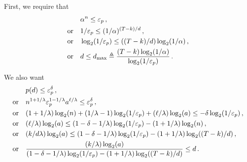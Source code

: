   First, we require that 
  \begin{align*}
    &\alpha^n \leq \mathsf{\varepsilon}_p\,,\\
    \text{or}\quad &
      1/\mathsf{\varepsilon}_p \leq (1/\alpha)^{(T - k)/d}\,,\\
    \text{or}\quad &
      \log_2(1/\mathsf{\varepsilon}_p) \leq ((T - k)/d)\log_2(1/\alpha)\,,\\
    \text{or}\quad &
      d \leq d_\mathrm{max} \triangleq \frac{(T - k)\log_2(1/\alpha)}{\log_2(1/\mathsf{\varepsilon}_p)}
      \,.
  \end{align*}

  We also want 
  \begin{align*}
    &p(d) \leq \mathsf{\varepsilon}_p^{\delta}\,,\\
    \text{or}\quad &
      n^{1+1/\lambda} \mathsf{\varepsilon}_p^{1 - 1/\lambda} a^{\ell/\lambda} \leq \mathsf{\varepsilon}_p^\delta \,,\\
    \text{or}\quad &
      (1+1/\lambda)\log_2(n)
      + (1/\lambda - 1)\log_2(1/\mathsf{\varepsilon}_p) 
      + (\ell/\lambda) \log_2(a) \leq -\delta \log_2(1/\mathsf{\varepsilon}_p) \,,\\
    \text{or}\quad &      
      (\ell/\lambda) \log_2(a) \leq (1-\delta - 1/\lambda) \log_2(1/\mathsf{\varepsilon}_p) - (1+1/\lambda)\log_2(n)\,,\\
    \text{or}\quad &      
      (k/d\lambda) \log_2(a) \leq (1-\delta - 1/\lambda) \log_2(1/\mathsf{\varepsilon}_p) - (1+1/\lambda)\log_2((T-k)/d)\,,\\
    \text{or}\quad &      
      \frac{(k/\lambda) \log_2(a)}{(1-\delta - 1/\lambda) \log_2(1/\mathsf{\varepsilon}_p) - (1+1/\lambda)\log_2((T-k)/d)} \leq d
      \,.
  \end{align*}
  
